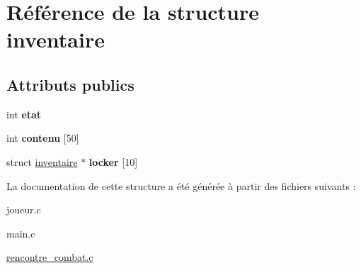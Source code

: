 \hypertarget{structinventaire}{\section{Référence de la structure inventaire}
\label{structinventaire}
}
\subsection*{Attributs publics}
\begin{DoxyCompactItemize}
\item 
\hypertarget{structinventaire_a33637327e7111ef85551a570d050eb94}{int {\bfseries etat}}\label{structinventaire_a33637327e7111ef85551a570d050eb94}

\item 
\hypertarget{structinventaire_a2d3dc4e8484f5ec5de6e222d63dc75a0}{int {\bfseries contenu} \mbox{[}50\mbox{]}}\label{structinventaire_a2d3dc4e8484f5ec5de6e222d63dc75a0}

\item 
\hypertarget{structinventaire_ad8ec26e7164e7b2d770dcab97793a005}{struct \hyperlink{structinventaire}{inventaire} $\ast$ {\bfseries locker} \mbox{[}10\mbox{]}}\label{structinventaire_ad8ec26e7164e7b2d770dcab97793a005}

\end{DoxyCompactItemize}


La documentation de cette structure a été générée à partir des fichiers suivants \-:\begin{DoxyCompactItemize}
\item 
joueur.\-c\item 
main.\-c\item 
\hyperlink{rencontre__combat_8c}{rencontre\-\_\-combat.\-c}\end{DoxyCompactItemize}
